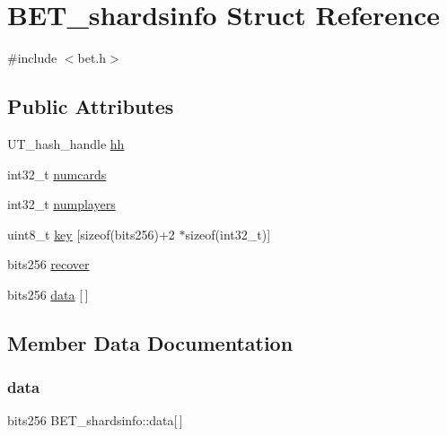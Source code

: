 \hypertarget{structBET__shardsinfo}{}\section{B\+E\+T\+\_\+shardsinfo Struct Reference}
\label{structBET__shardsinfo}


{\ttfamily \#include $<$bet.\+h$>$}

\subsection*{Public Attributes}
\begin{DoxyCompactItemize}
\item 
U\+T\+\_\+hash\+\_\+handle \hyperlink{structBET__shardsinfo_a6553a2f82e2eaa698bc743d7214cacca}{hh}
\item 
int32\+\_\+t \hyperlink{structBET__shardsinfo_a51fbef7e339f923d13381b8e302defe2}{numcards}
\item 
int32\+\_\+t \hyperlink{structBET__shardsinfo_a0873504d0f2c17a1a4e6983e62903857}{numplayers}
\item 
uint8\+\_\+t \hyperlink{structBET__shardsinfo_aa90bedeb796a7940ff452191c5405a31}{key} \mbox{[}sizeof(bits256)+2 $\ast$sizeof(int32\+\_\+t)\mbox{]}
\item 
bits256 \hyperlink{structBET__shardsinfo_a293358259dce8c51fbdeaf1b6323e495}{recover}
\item 
bits256 \hyperlink{structBET__shardsinfo_ac11f71d5b02d8113ab4c2764505deca0}{data} \mbox{[}$\,$\mbox{]}
\end{DoxyCompactItemize}


\subsection{Member Data Documentation}
\mbox{\label{structBET__shardsinfo_ac11f71d5b02d8113ab4c2764505deca0}} 
\subsubsection{\texorpdfstring{data}{data}}
{\footnotesize\ttfamily bits256 B\+E\+T\+\_\+shardsinfo\+::data\mbox{[}$\,$\mbox{]}}

\mbox{\label{structBET__shardsinfo_a6553a2f82e2eaa698bc743d7214cacca}} 
